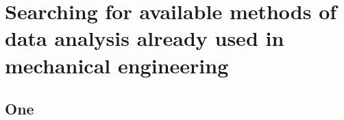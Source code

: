 \chapter{Searching for available methods of data analysis already used in mechanical engineering}

\section{One}
